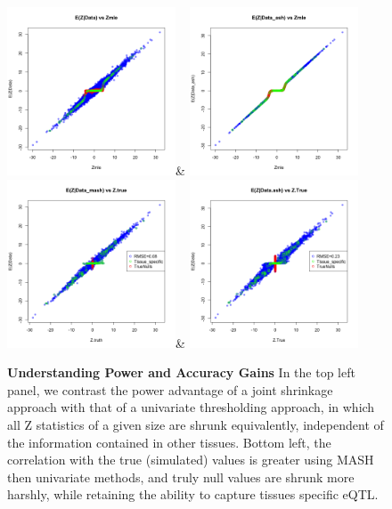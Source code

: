 \begin{figure}[htbp]
\includegraphics[width=5cm]{Figures/scatterplot_fittedtspec.png}&
\includegraphics[width=5cm]{Figures/scatterplot_fittedtspec_ash.png}\\
\hfill
\includegraphics[width=5cm]{Figures/scatterplot_truthtspec.png}&
\includegraphics[width=5cm]{Figures/scatterplot_TRUTHashtspec.png}
\caption{\textbf{Understanding Power and Accuracy Gains} In the top left panel, we contrast the power advantage of a joint shrinkage approach with that of a univariate thresholding approach, in which all Z statistics of a given size are shrunk equivalently, independent of the information contained in other tissues. Bottom left, the correlation with the true (simulated) values is greater using MASH then univariate methods, and truly null values are shrunk more harshly, while retaining the ability to capture tissues specific eQTL.}
 \label{fig:simulationscatter}
\end{figure}\newline





